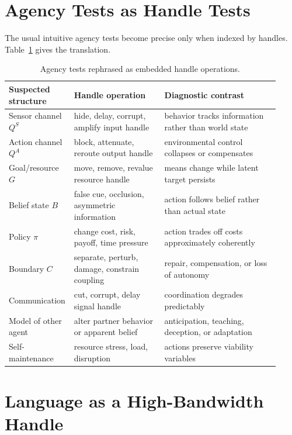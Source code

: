 \documentclass[11pt]{article}
\begin{document}
\section{Agency Tests as Handle Tests}

The usual intuitive agency tests become precise only when indexed by handles.
Table~\ref{tab:handle-tests} gives the translation.

\begin{table}[h]
\centering
\small
\begin{tabular}{@{}p{0.17\linewidth}p{0.33\linewidth}p{0.42\linewidth}@{}}
\toprule
Suspected structure & Handle operation & Diagnostic contrast \\
\midrule
Sensor channel $Q^S$ &
hide, delay, corrupt, amplify input handle &
behavior tracks information rather than world state \\
Action channel $Q^A$ &
block, attenuate, reroute output handle &
environmental control collapses or compensates \\
Goal/resource $G$ &
move, remove, revalue resource handle &
means change while latent target persists \\
Belief state $B$ &
false cue, occlusion, asymmetric information &
action follows belief rather than actual state \\
Policy $\pi$ &
change cost, risk, payoff, time pressure &
action trades off costs approximately coherently \\
Boundary $C$ &
separate, perturb, damage, constrain coupling &
repair, compensation, or loss of autonomy \\
Communication &
cut, corrupt, delay signal handle &
coordination degrades predictably \\
Model of other agent &
alter partner behavior or apparent belief &
anticipation, teaching, deception, or adaptation \\
Self-maintenance &
resource stress, load, disruption &
actions preserve viability variables \\
\bottomrule
\end{tabular}
\caption{Agency tests rephrased as embedded handle operations.}
\label{tab:handle-tests}
\end{table}

\section{Language as a High-Bandwidth Handle}
\end{document}
